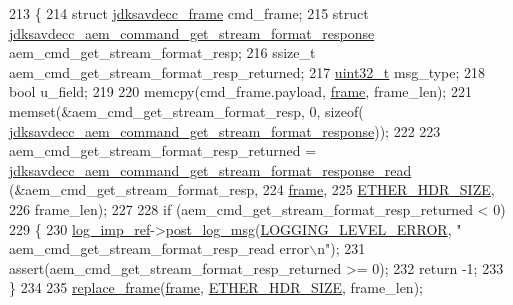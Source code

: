 \begin{DoxyCode}
213 \{
214     \textcolor{keyword}{struct }\hyperlink{structjdksavdecc__frame}{jdksavdecc\_frame} cmd\_frame;
215     \textcolor{keyword}{struct }\hyperlink{structjdksavdecc__aem__command__get__stream__format__response}{jdksavdecc\_aem\_command\_get\_stream\_format\_response}
       aem\_cmd\_get\_stream\_format\_resp;
216     ssize\_t aem\_cmd\_get\_stream\_format\_resp\_returned;
217     \hyperlink{parse_8c_a6eb1e68cc391dd753bc8ce896dbb8315}{uint32\_t} msg\_type;
218     \textcolor{keywordtype}{bool} u\_field;
219 
220     memcpy(cmd\_frame.payload, \hyperlink{gst__avb__playbin_8c_ac8e710e0b5e994c0545d75d69868c6f0}{frame}, frame\_len);
221     memset(&aem\_cmd\_get\_stream\_format\_resp, 0, \textcolor{keyword}{sizeof}(
      \hyperlink{structjdksavdecc__aem__command__get__stream__format__response}{jdksavdecc\_aem\_command\_get\_stream\_format\_response}));
222 
223     aem\_cmd\_get\_stream\_format\_resp\_returned = 
      \hyperlink{group__command__get__stream__format__response_ga5276f0e7a55c3e8acacbd787d2e1cef1}{jdksavdecc\_aem\_command\_get\_stream\_format\_response\_read}
      (&aem\_cmd\_get\_stream\_format\_resp,
224                                                                                                      
      \hyperlink{gst__avb__playbin_8c_ac8e710e0b5e994c0545d75d69868c6f0}{frame},
225                                                                                                      
      \hyperlink{namespaceavdecc__lib_a6c827b1a0d973e18119c5e3da518e65ca9512ad9b34302ba7048d88197e0a2dc0}{ETHER\_HDR\_SIZE},
226                                                                                                      
      frame\_len);
227 
228     \textcolor{keywordflow}{if} (aem\_cmd\_get\_stream\_format\_resp\_returned < 0)
229     \{
230         \hyperlink{namespaceavdecc__lib_acbe3e2a96ae6524943ca532c87a28529}{log\_imp\_ref}->\hyperlink{classavdecc__lib_1_1log_a68139a6297697e4ccebf36ccfd02e44a}{post\_log\_msg}(\hyperlink{namespaceavdecc__lib_a501055c431e6872ef46f252ad13f85cdaf2c4481208273451a6f5c7bb9770ec8a}{LOGGING\_LEVEL\_ERROR}, \textcolor{stringliteral}{"
      aem\_cmd\_get\_stream\_format\_resp\_read error\(\backslash\)n"});
231         assert(aem\_cmd\_get\_stream\_format\_resp\_returned >= 0);
232         \textcolor{keywordflow}{return} -1;
233     \}
234 
235     \hyperlink{classavdecc__lib_1_1descriptor__base__imp_a482fe95208e9e14885e28e73e7be2c49}{replace\_frame}(\hyperlink{gst__avb__playbin_8c_ac8e710e0b5e994c0545d75d69868c6f0}{frame}, \hyperlink{namespaceavdecc__lib_a6c827b1a0d973e18119c5e3da518e65ca9512ad9b34302ba7048d88197e0a2dc0}{ETHER\_HDR\_SIZE}, frame\_len);

\end{DoxyCode}
